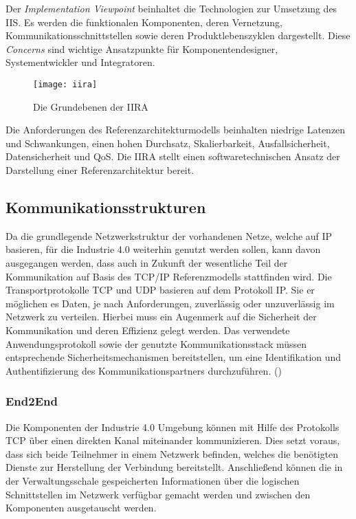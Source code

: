 Der \textit{Implementation Viewpoint} beinhaltet die Technologien zur Umsetzung des \ac{IIS}. Es werden die funktionalen Komponenten, deren Vernetzung, Kommunikationsschnittstellen sowie deren Produktlebenszyklen dargestellt. Diese \textit{Concerns} sind wichtige Ansatzpunkte für Komponentendesigner, Systementwickler und Integratoren. 

\begin{figure}[h]
  \centering
  \texttt{[image: iira]}
  \caption{Die Grundebenen der IIRA} 
  \label{Grundlagen:IIAF/IIRA - Übersicht}
\end{figure}

Die Anforderungen des Referenzarchitekturmodells beinhalten niedrige Latenzen und Schwankungen, einen hohen Durchsatz, Skalierbarkeit, Ausfallsicherheit, Datensicherheit und \ac{QoS}. Die \ac{IIRA} stellt einen softwaretechnischen Ansatz der Darstellung einer Referenzarchitektur bereit.

\subsection{Kommunikationsstrukturen}
\label{Grundlagen:Kommunikationsstrukturen}
Da die grundlegende Netzwerkstruktur der vorhandenen Netze, welche auf \ac{IP} basieren, für die Industrie 4.0 weiterhin genutzt werden sollen, kann davon ausgegangen werden, dass auch in Zukunft der wesentliche Teil der Kommunikation auf Basis des \ac{TCP}/\ac{IP} Referenzmodells stattfinden wird. Die Transportprotokolle \ac{TCP} und \ac{UDP} basieren auf dem Protokoll \ac{IP}. Sie er möglichen es Daten, je nach Anforderungen, zuverlässig oder unzuverlässig im Netzwerk zu verteilen. Hierbei muss ein Augenmerk auf die Sicherheit der Kommunikation und deren Effizienz gelegt werden. Das verwendete Anwendungsprotokoll sowie der genutzte Kommunikationsstack müssen entsprechende Sicherheitsmechanismen bereitstellen, um eine Identifikation und Authentifizierung des Kommunikationspartners durchzuführen. (\cite{sichKom2017})

\subsubsection{End2End}
\label{Grundlagen:End2End}
Die Komponenten der Industrie 4.0 Umgebung können mit Hilfe des Protokolls \ac{TCP} über einen direkten Kanal miteinander kommunizieren. Dies setzt voraus, dass sich beide Teilnehmer in einem Netzwerk befinden, welches die benötigten Dienste zur Herstellung der Verbindung bereitstellt. Anschließend können die in der Verwaltungsschale gespeicherten Informationen über die logischen Schnittstellen im Netzwerk verfügbar gemacht werden und zwischen den Komponenten ausgetauscht werden.

